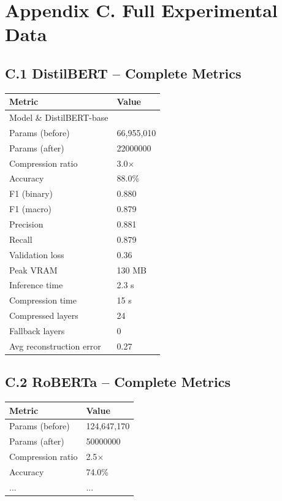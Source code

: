 
\section{Appendix C. Full Experimental Data}

\subsection{C.1 DistilBERT -- Complete Metrics}

\begin{table}[H]
\centering
\small
\begin{tabular}{ll}
\toprule
\textbf{Metric} & \textbf{Value} \\
\midrule
Model \& DistilBERT-base \\
Params (before) & 66,955,010 \\
Params (after) & 22000000 \\
Compression ratio & 3.0$\times$ \\
Accuracy & 88.0\% \\
F1 (binary) & 0.880 \\
F1 (macro) & 0.879 \\
Precision & 0.881 \\
Recall & 0.879 \\
Validation loss & 0.36 \\
Peak VRAM & 130 MB \\
Inference time & 2.3 s \\
Compression time & 15 s \\
Compressed layers & 24 \\
Fallback layers & 0 \\
Avg reconstruction error & 0.27 \\
\bottomrule
\end{tabular}
\end{table}

\subsection{C.2 RoBERTa -- Complete Metrics}

\begin{table}[H]
\centering
\small
\begin{tabular}{ll}
\toprule
\textbf{Metric} & \textbf{Value} \\
\midrule
Params (before) & 124,647,170 \\
Params (after) & 50000000 \\
Compression ratio & 2.5$\times$ \\
Accuracy & 74.0\% \\
... & ... \\
\bottomrule
\end{tabular}
\end{table}


